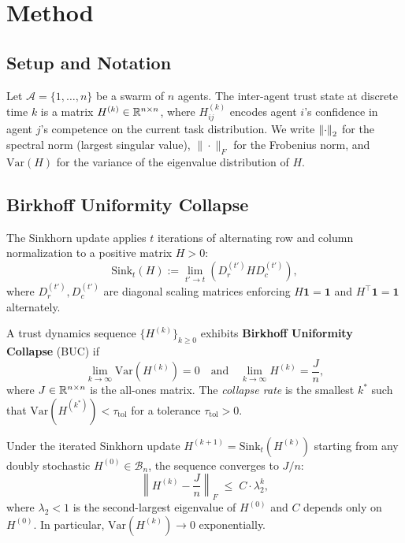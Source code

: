 \section{Method}
\label{sec:method}

\subsection{Setup and Notation}

Let $\mathcal{A} = \{1, \ldots, n\}$ be a swarm of $n$ agents.  The inter-agent trust
state at discrete time $k$ is a matrix $H^{(k)} \in \mathbb{R}^{n \times n}$, where
$H^{(k)}_{ij}$ encodes agent $i$'s confidence in agent $j$'s competence on the current
task distribution.  We write $\left\|\cdot\right\|_2$ for the spectral norm (largest singular
value), $\|\cdot\|_F$ for the Frobenius norm, and $\mathrm{Var}(H)$ for the variance of
the eigenvalue distribution of $H$.

\subsection{Birkhoff Uniformity Collapse}

\begin{definition}
  \label{def:sinkhorn_rule}
  The Sinkhorn update applies $t$ iterations of alternating row and column normalization
  to a positive matrix $H > 0$:
  \[
    \mathrm{Sink}_t(H) := \lim_{t' \to t} \left(D_r^{(t')} H D_c^{(t')}\right),
  \]
  where $D_r^{(t')}, D_c^{(t')}$ are diagonal scaling matrices enforcing
  $H\mathbf{1} = \mathbf{1}$ and $H^\top\mathbf{1} = \mathbf{1}$ alternately.
\end{definition}

\begin{definition}
  \label{def:buc}
  A trust dynamics sequence $\{H^{(k)}\}_{k \geq 0}$ exhibits \textbf{Birkhoff
  Uniformity Collapse} (BUC) if
  \[
    \lim_{k \to \infty} \mathrm{Var}\!\left(H^{(k)}\right) = 0
    \quad \text{and} \quad
    \lim_{k \to \infty} H^{(k)} = \frac{J}{n},
  \]
  where $J \in \mathbb{R}^{n \times n}$ is the all-ones matrix.  The \emph{collapse rate} is
  the smallest $k^*$ such that $\mathrm{Var}(H^{(k^*)}) < \tau_{\mathrm{tol}}$ for a
  tolerance $\tau_{\mathrm{tol}} > 0$.
\end{definition}

\begin{theorem}
  \label{thm:sinkhorn_collapses}
  Under the iterated Sinkhorn update $H^{(k+1)} = \mathrm{Sink}_t(H^{(k)})$ starting
  from any doubly stochastic $H^{(0)} \in \mathcal{B}_n$, the sequence converges to
  $J/n$:
  \[
    \left\|H^{(k)} - \frac{J}{n}\right\|_F \;\leq\; C \cdot \lambda_2^k,
  \]
  where $\lambda_2 < 1$ is the second-largest eigenvalue of $H^{(0)}$ and $C$ depends
  only on $H^{(0)}$.  In particular, $\mathrm{Var}(H^{(k)}) \to 0$ exponentially.
\end{theorem}

